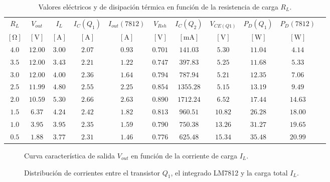 \begin{table}[!ht]
\centering
\caption{Valores eléctricos y de disipación térmica en función de la resistencia de carga $R_L$.}
\label{tab.c5:sobrecarga}
\begin{tabular}{ccccccccccc}
\hline
$R_L$ & $V_{out}$ & $I_L$ & $I_C(Q_1)$ & $I_{out}(7812)$ & $V_{Rsh}$ & $I_C(Q_2)$ & $V_{CE(Q1)}$ & $P_D(Q_1)$ & $P_D(7812)$ \\
$[\si{\ohm}]$ & $[\si{\volt}]$ & $[\si{\ampere}]$ & $[\si{\ampere}]$ & $[\si{\ampere}]$ & $[\si{\volt}]$ & $[\si{\milli\ampere}]$ & $[\si{\volt}]$ & $[\si{\watt}]$ & $[\si{\watt}]$ \\
\hline
$4.0$ & $12.00$ & $3.00$ & $2.07$ & $0.93$ & $0.701$ & $141.03$  & $5.30$  & $11.04$ & $4.14$ \\
$3.5$ & $12.00$ & $3.43$ & $2.21$ & $1.22$ & $0.747$ & $397.83$  & $5.25$  & $11.68$ & $5.33$ \\
$3.0$ & $12.00$ & $4.00$ & $2.36$ & $1.64$ & $0.794$ & $787.94$  & $5.21$  & $12.35$ & $7.06$ \\
$2.5$ & $11.99$ & $4.80$ & $2.55$ & $2.25$ & $0.854$ & $1355.28$ & $5.15$  & $13.19$ & $9.49$ \\
$2.0$ & $10.59$ & $5.30$ & $2.66$ & $2.63$ & $0.890$ & $1712.24$ & $6.52$  & $17.44$ & $14.63$ \\
$1.5$ & $6.37$  & $4.24$ & $2.42$ & $1.82$ & $0.813$ & $960.51$  & $10.82$ & $26.28$ & $18.00$ \\
$1.0$ & $3.95$  & $3.95$ & $2.35$ & $1.59$ & $0.790$ & $750.38$  & $13.26$ & $31.27$ & $19.65$ \\
$0.5$ & $1.88$  & $3.77$ & $2.31$ & $1.46$ & $0.776$ & $625.48$  & $15.34$ & $35.48$ & $20.99$ \\
\hline
\end{tabular}
\end{table}

\begin{figure}[!ht]
    \centering
    
    \caption{Curva característica de salida $V_{out}$ en función de la corriente de carga $I_L$.}
    \label{fig.c5:curva_salida}
\end{figure}

\begin{figure}[!ht]
    \centering
    
    \caption{Distribución de corrientes entre el transistor $Q_1$, el integrado LM7812 y la carga total $I_L$.}
    \label{fig.c5:reparto_corrientes}
\end{figure}

